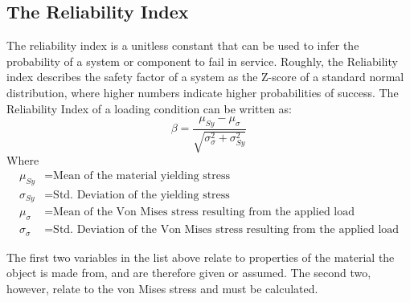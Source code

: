 \subsection{The Reliability Index}
\label{sec:beta}
The reliability index is a unitless constant that can be used to infer the probability of a system or component to fail in service. Roughly, the Reliability index describes the safety factor of a system as the Z-score of a standard normal distribution, where higher numbers indicate higher probabilities of success. The Reliability Index of a loading condition can be written as: 
   \begin{equation}
	   \beta = \frac{\mu_{Sy} - \mu_\sigma}{\sqrt{\sigma_{\sigma}^2 + \sigma_{Sy}^2}}
	   \label{eq:beta}
   \end{equation}
Where
   \begin{align*}
	   \mu_{Sy} &= \text{Mean of the material yielding stress}\\
	   \sigma_{Sy} &= \text{Std. Deviation of the yielding stress}\\
	   \mu_{\sigma} &= \text{Mean of the Von Mises stress resulting from the applied load}\\
	   \sigma_{\sigma} &= \text{Std. Deviation of the Von Mises stress resulting from the applied load}
   \end{align*}

The first two variables in the list above relate to properties of the material the object is made from, and are therefore given or assumed. The second two, however, relate to the von Mises stress and must be calculated.

